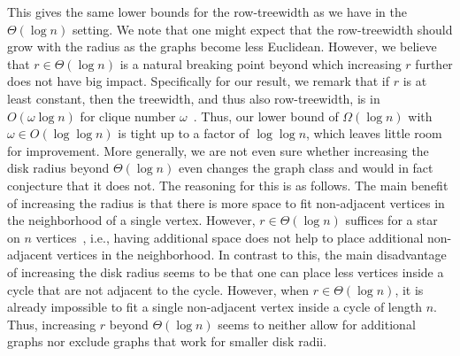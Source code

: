\documentclass[11pt]{article}
\providecommand{\todo}[2][]{}
\begin{document}
%
This gives the same lower bounds for the row-treewidth as we have in the $ \Theta(\log n)$ setting.
We note that one might expect that the row-treewidth should grow with the radius as the graphs become less Euclidean.
However, we believe that $r \in \Theta(\log n)$ is a natural breaking point beyond which increasing $r$ further does not have big impact.
Specifically for our result, we remark that if $r $ is at least constant, then the treewidth, and thus also row-treewidth, is in $O(\omega \log n)$ for clique number $ \omega $~\cite{Struc_Indep_Hyper_Unifor_Disk_Graph-Blaesius25,Treew_Graph_Balan_Separ-DvoraNorin19}.
Thus, our lower bound of $\Omega(\log n)$ with $\omega \in O(\log\log n)$ is tight up to a factor of $\log\log n$, which leaves little room for improvement.
%
More generally, we are not even sure whether increasing the disk radius beyond $\Theta(\log n)$ even changes the graph class and would in fact conjecture that it does not.
The reasoning for this is as follows.
The main benefit of increasing the radius is that there is more space to fit non-adjacent vertices in the neighborhood of a single vertex.
However, $r \in \Theta(\log n)$ suffices for a star on $n$ vertices~\cite{Struc_Indep_Hyper_Unifor_Disk_Graph-Blaesius25}, i.e., having additional space does not help to place additional non-adjacent vertices in the neighborhood.
In contrast to this, the main disadvantage of increasing the disk radius seems to be that one can place less vertices inside a cycle that are not adjacent to the cycle.
However, when $r \in \Theta(\log n)$, it is already impossible to fit a single non-adjacent vertex inside a cycle of length $n$.
Thus, increasing $r$ beyond $\Theta(\log n)$ seems to neither allow for additional graphs nor exclude graphs that work for smaller disk radii.
%
%
%
\todo[inline]{At the moment, we mostly omit the tightness of our constructions. Do we want to discuss this? → include more on lower bounds}
%
% 
%
%
%
%
\end{document}
